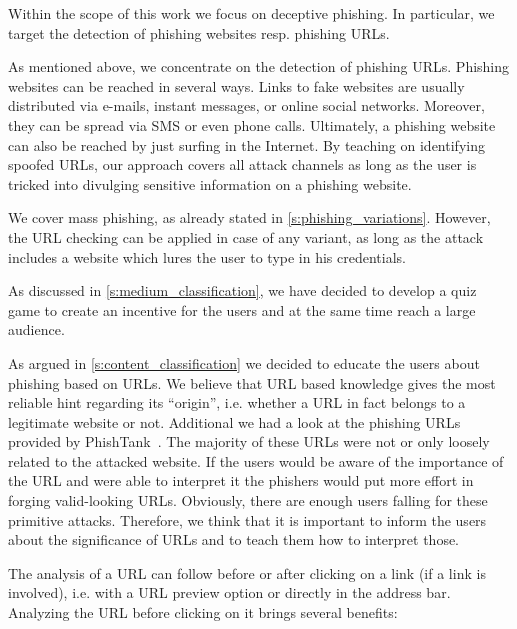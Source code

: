 \begin{description}[leftmargin=0cm]
	\item[Deceptive Phishing as Phishing Technique] Within the scope of this work we focus on deceptive phishing.
 In particular, we target the detection of phishing websites resp. phishing URLs.
	\item[Several Attack Channels] As mentioned above, we concentrate on the detection of phishing URLs.
 Phishing websites can be reached in several ways.
 Links to fake websites are usually distributed via e-mails, instant messages, or online social networks.
 Moreover, they can be spread via SMS or even phone calls.
 Ultimately, a phishing website can also be reached by just surfing in the Internet.
 By teaching on identifying spoofed URLs, our approach covers all attack channels as long as the user is tricked into divulging sensitive information on a phishing website.

	\item[Mass Phishing as Variation of Phishing] We cover mass phishing, as already stated in \autoref{s:phishing_variations}.
 However, the URL checking can be applied in case of any variant, as long as the attack includes a website which lures the user to type in his credentials.

	\item[Game and Quiz Based Learning as Communication Medium] As discussed in \autoref{s:medium_classification}, we have decided to develop a quiz game to create an incentive for the users and at the same time reach a large audience. 

	\item[URL Based Knowledge as Learning Content] As argued in \autoref{s:content_classification} we decided to educate the users about phishing based on URLs. 
We believe that URL based knowledge gives the most reliable hint regarding its ``origin'', i.e. whether a URL in fact belongs to a legitimate website or not.
Additional we had a look at the phishing URLs provided by PhishTank~\cite{phishtank}. The majority of these URLs were not or only loosely related to the attacked website. If the users would be aware of the importance of the URL and were able to interpret it the phishers would put more effort in forging valid-looking URLs. Obviously, there are enough users falling for these primitive attacks. Therefore, we think that it is important to inform the users about the significance of URLs and to teach them how to interpret those.

	\item[After Click URL Analysis] The analysis of a URL can follow before or after clicking on a link (if a link is involved), i.e. with a URL preview option or directly in the address bar. 
Analyzing the URL before clicking on it brings several benefits:


\end{description}
